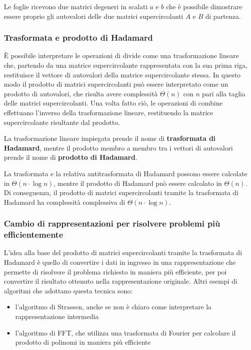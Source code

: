 Le foglie ricevono due matrici degeneri in scalati \(a\) e \(b\) che è possibile dimostrare essere proprio gli autovalori
delle due matrici supercircolanti \(A\) e \(B\) di partenza.

\subsubsection*{Trasformata e prodotto di Hadamard}
È possibile interpretare le operazioni di divide come una trasformazione lineare che, partendo da una matrice supercircolante
rappresentata con la sua prima riga, restituisce il vettore di autovalori della matrice supercircolante stessa. In questo modo
il prodotto di matrici supercircolanti può essere interpretato come un prodotto di autovalori, che risulta avere complessità
\(\Theta(n)\) con \(n\) pari alla taglia delle matrici supercircolanti. Una volta fatto ciò, le operazioni di combine effettuano
l'inverso della trasformazione lineare, restituendo la matrice supercircolante risultante dal prodotto.

La trasformazione lineare impiegata prende il nome di \textbf{trasformata di Hadamard}, mentre il prodotto membro a membro
tra i vettori di autovalori prende il nome di \textbf{prodotto di Hadamard}.

La trasformata e la relativa antitrasformata di Hadamard possono essere calcolate in \(\Theta(n \cdot \log n)\), mentre
il prodotto di Hadamard può essere calcolato in \(\Theta(n)\). Di conseguenza, il prodotto di matrici supercircolanti tramite
la trasformata di Hadamard ha complessità complessiva di \(\Theta(n \cdot \log n)\).

\subsubsection*{Cambio di rappresentazioni per risolvere problemi più efficientemente}
L'idea alla base del prodotto di matrici supercircolanti tramite la trasformata di Hadamard è quello di convertire i dati
in ingresso in una rappresentazione che permette di risolvere il problema richiesto in maniera più efficiente, per poi
convertire il risultato ottenuto nella rappresentazione originale. Altri esempi di algoritmi che adottano questa tecnica sono:
\begin{itemize}
	\item l'algoritmo di Strassen, anche se non è chiaro come interpretare la rappresentazione intermedia
	\item l'algoritmo di FFT, che utilizza una trasformata di Fourier per calcolare il prodotto di polinomi in maniera
	più efficiente
\end{itemize}

